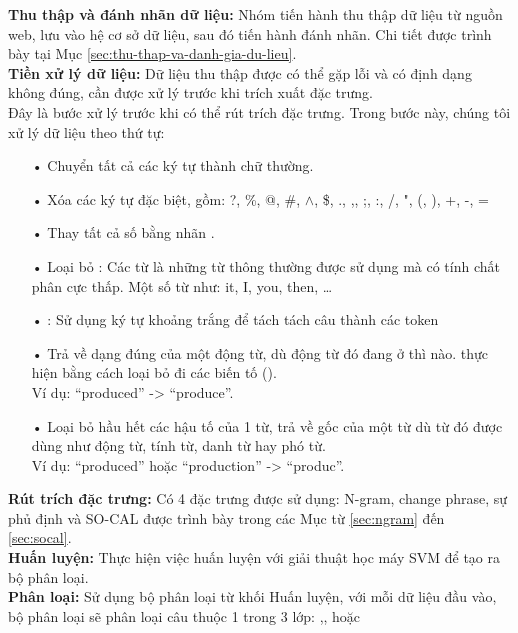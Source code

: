 \textbf{Thu thập và đánh nhãn dữ liệu:} Nhóm tiến hành thu thập dữ liệu từ nguồn web, lưu vào hệ cơ sở dữ liệu, sau đó tiến hành đánh nhãn. Chi tiết được trình bày tại Mục \ref{sec:thu-thap-va-danh-gia-du-lieu}.\\

\textbf{Tiền xử lý dữ liệu:} Dữ liệu thu thập được có thể gặp lỗi và có định dạng không đúng, cần được xử lý trước khi trích xuất đặc trưng. \\

Đây là bước xử lý trước khi có thể rút trích đặc trưng. Trong bước này, chúng tôi xử lý dữ liệu theo thứ tự:
\begin{itemize}
\item[•] Chuyển tất cả các ký tự thành chữ thường.
\item[•] Xóa các ký tự đặc biệt, gồm: ?, \%, @, \#, $\wedge$, \$, ., ,,  ;, :, /, ", (, ), +, -, =
\item[•] Thay tất cả số bằng nhãn .
\item[•] Loại bỏ : Các từ  là những từ thông thường được sử dụng mà có tính chất phân cực thấp. Một số từ  như: it, I, you, then, \ldots
\item[•] : Sử dụng ký tự khoảng trắng để tách tách câu thành các token
\item[•]  Trả về dạng đúng của một động từ, dù động từ đó đang ở thì nào.  thực hiện bằng cách loại bỏ đi các biến tố (). \\
Ví dụ: ``produced'' -> ``produce''.
\item[•]  Loại bỏ hầu hết các hậu tố của 1 từ, trả về gốc của một từ dù từ đó được dùng như động từ, tính từ, danh từ hay phó từ.\\
 Ví dụ:  ``produced'' hoặc ``production'' -> ``produc''.
\end{itemize}
\textbf{Rút trích đặc trưng:} Có 4 đặc trưng được sử dụng: N-gram, change phrase, sự phủ định và SO-CAL được trình bày trong các Mục từ \ref{sec:ngram} đến \ref{sec:socal}. \\

\textbf{Huấn luyện:} Thực hiện việc huấn luyện với giải thuật học máy SVM để tạo ra bộ phân loại.\\

\textbf{Phân loại:} Sử dụng bộ phân loại từ khối Huấn luyện, với mỗi dữ liệu đầu vào, bộ phân loại sẽ phân loại câu thuộc 1 trong 3 lớp: \tichcuc,\tieucuc, hoặc \trungtinh\\

